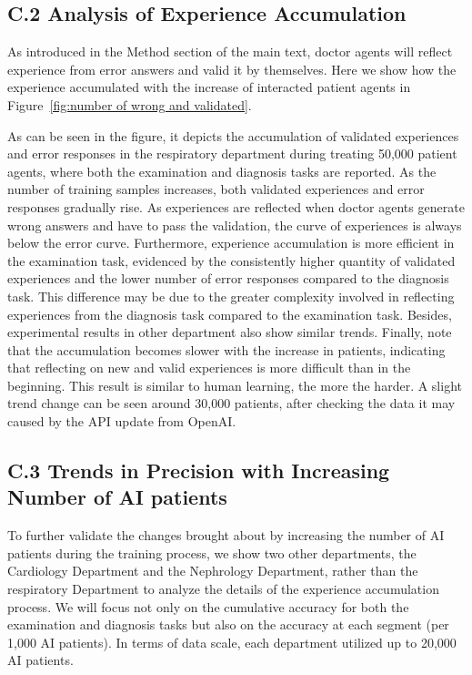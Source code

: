 \documentclass[fleqn,12pt]{wlscirep}
\begin{document}
\subsection*{C.2 Analysis of Experience Accumulation}

As introduced in the Method section of the main text, doctor agents will reflect experience from error answers and valid it by themselves. Here we show how the experience accumulated with the increase of interacted patient agents in Figure~\ref {fig:number of wrong and validated}.


As can be seen in the figure, it depicts the accumulation of validated experiences and error responses in the respiratory department during treating 50,000 patient agents, where both the examination and diagnosis tasks are reported. As the number of training samples increases, both validated experiences and error responses gradually rise. As experiences are reflected when doctor agents generate wrong answers and have to pass the validation, the curve of experiences is always below the error curve.
Furthermore, experience accumulation is more efficient in the examination task, evidenced by the consistently higher quantity of validated experiences and the lower number of error responses compared to the diagnosis task. 
This difference may be due to the greater complexity involved in reflecting experiences from the diagnosis task compared to the examination task. 
Besides, experimental results in other department also show similar trends.
Finally, note that the accumulation becomes slower with the increase in patients, indicating that reflecting on new and valid experiences is more difficult than in the beginning. This result is similar to human learning, the more the harder. A slight trend change can be seen around 30,000 patients, after checking the data it may caused by the API update from OpenAI.


\subsection*{C.3 Trends in Precision with Increasing Number of AI patients}

To further validate the changes brought about by increasing the number of AI patients during the training process, we show two other departments, the Cardiology Department and the Nephrology Department, rather than the respiratory Department to analyze the details of the experience accumulation process. We will focus not only on the cumulative accuracy for both the examination and diagnosis tasks but also on the accuracy at each segment (per 1,000 AI patients). In terms of data scale, each department utilized up to 20,000 AI patients.
\end{document}
